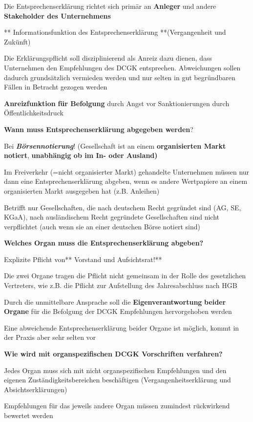 \documentclass[
]{article}
\begin{document}
Die Entsprechenserklärung richtet sich primär an \textbf{Anleger} und
andere \textbf{Stakeholder des Unternehmens}

** Informationsfunktion des Entsprechenserklärung **(Vergangenheit und
Zukünft)

Die Erklärungspflicht soll disziplinierend als Anreiz dazu dienen, dass
Unternehmen den Empfehlungen des DCGK entsprechen. Abweichungen sollen
dadurch grundsätzlich vermieden werden und nur selten in gut
begründbaren Fällen in Betracht gezogen werden

\textbf{Anreizfunktion} \textbf{für Befolgung} durch Angst vor
Sanktionierungen durch Öffentlichkeitsdruck

\textbf{Wann muss Entsprechenserklärung abgegeben werden}?

Bei \textbf{\emph{Börsennotierung}}! (Gesellschaft ist an einem
\textbf{organisierten Markt notiert}, \textbf{unabhängig ob im In- oder
Ausland)}

Im Freiverkehr (=nicht organisierter Markt) gehandelte Unternehmen
müssen nur dann eine Entsprechenserklärung abgeben, wenn es andere
Wertpapiere an einem organisierten Markt ausgegeben hat (z.B. Anleihen)

Betrifft nur Gesellschaften, die nach deutschem Recht gegründet sind
(AG, SE, KGaA), nach ausländischem Recht gegründete Gesellschaften sind
nicht verpflichtet (auch wenn sie an einer deutschen Börse notiert sind)

\textbf{Welches Organ muss die Entsprechenserklärung abgeben? }

Explizite Pflicht von** Vorstand und Aufsichtsrat!**

Die zwei Organe tragen die Pflicht nicht gemeinsam in der Rolle des
gesetzlichen Vertreters, wie z.B. die Pflicht zur Aufstellung des
Jahresabschluss nach HGB

Durch die unmittelbare Ansprache soll die \textbf{Eigenverantwortung}
\textbf{beider Organe} für die Befolgung der DCGK Empfehlungen
hervorgehoben werden

Eine abweichende Entsprechenserklärung beider Organe ist möglich, kommt
in der Praxis aber sehr selten vor

\textbf{Wie wird mit organspezifischen DCGK Vorschriften verfahren?}

Jedes Organ muss sich mit nicht organspezifischen Empfehlungen und den
eigenen Zuständigkeitsbereichen beschäftigen (Vergangenheitserklärung
und Absichtserklärungen)

Empfehlungen für das jeweils andere Organ müssen zumindest rückwirkend
bewertet werden
\end{document}
